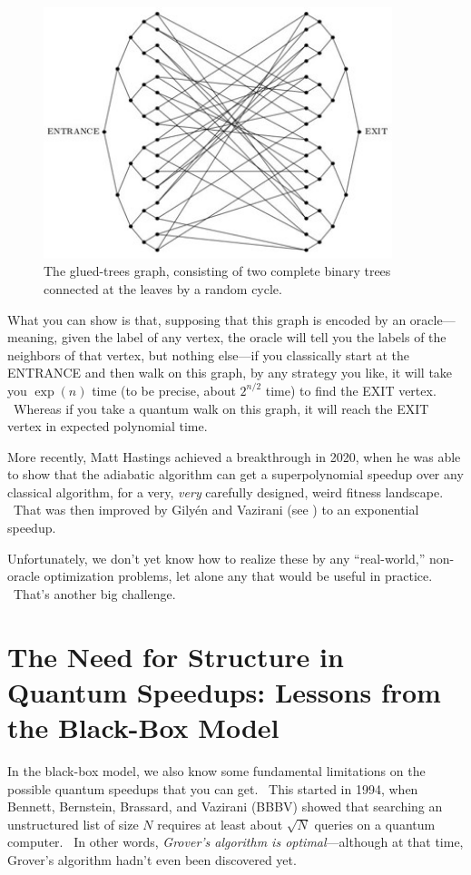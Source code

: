 \documentclass[11pt]{article}
\begin{document}
\begin{figure}
\centering
\includegraphics[width=4in]{gluedtrees.jpg}
\caption{The glued-trees graph, consisting of two complete binary trees connected at the leaves by a random cycle.}
\label{gluedtrees}
\end{figure}

What you can show is that, supposing that this graph is encoded by an oracle---meaning, given the label of any vertex, the oracle will tell you the labels of the neighbors of that vertex, but nothing else---if you classically start at the ENTRANCE and then walk on this graph, by any strategy you like, it will take you $\exp(n)$ time (to be precise, about $2^{n/2}$ time) to find the EXIT vertex. \ Whereas if you take a quantum walk on this graph, it will reach the EXIT vertex in expected polynomial time.

More recently, Matt Hastings \cite{hastings:adiabatic} achieved a breakthrough in 2020, when he was able to show that the adiabatic algorithm can get a superpolynomial speedup over any classical algorithm, for a very, \emph{very} carefully designed, weird fitness landscape. \ That was then improved by Gily\'{e}n and Vazirani (see \cite{gilyenvazirani}) to an exponential speedup.

Unfortunately, we don't yet know how to realize these by any ``real-world,'' non-oracle optimization problems, let alone any that would be useful in practice. \ That's another big challenge.


\section{The Need for Structure in Quantum Speedups: Lessons from the Black-Box Model}

In the black-box model, we also know some fundamental limitations on the possible quantum speedups that you can get. \ This started in 1994, when Bennett, Bernstein, Brassard, and Vazirani (BBBV) \cite{bbbv} showed that searching an unstructured list of size $N$ requires at least about $\sqrt N$ queries on a quantum computer. \ In other words, \emph{Grover's algorithm is optimal}---although at that time, Grover's algorithm hadn't even been discovered yet.
\end{document}
